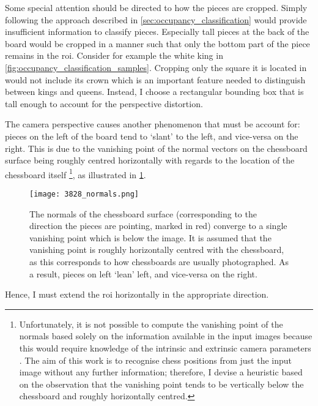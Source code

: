 \documentclass[../report.tex]{subfiles}
\begin{document}
Some special attention should be directed to how the pieces are cropped. 
Simply following the approach described in \cref{sec:occupancy_classification} would provide insufficient information to classify pieces.
Especially tall pieces at the back of the board would be cropped in a manner such that only the bottom part of the piece remains in the \gls{roi}. 
Consider for example the white king in \cref{fig:occupancy_classification_samples}.
Cropping only the square it is located in would not include its crown which is an important feature needed to distinguish between kings and queens.
Instead, I choose a rectangular bounding box that is tall enough to account for the perspective distortion.

The camera perspective causes another phenomenon that must be account for: pieces on the left of the board tend to `slant' to the left, and vice-versa on the right.
This is due to the vanishing point of the normal vectors on the chessboard surface being roughly centred horizontally with regards to the location of the chessboard itself%
\footnote{%
    Unfortunately, it is not possible to compute the vanishing point of the normals based solely on the information available in the input images because this would require knowledge of the intrinsic and extrinsic camera parameters \cite{hartley2004}.
    The aim of this work is to recognise chess positions from just the input image without any further information; therefore, I devise a heuristic based on the observation that the vanishing point tends to be vertically below the chessboard and roughly horizontally centred.
}, as illustrated in \cref{fig:occupancy_classification_normals}.
\begin{figure}
    \centering
    \texttt{[image: 3828\_normals.png]}
    \caption[The normals of the chessboard surface converge to a single vanishing point which is below the image.]{The normals of the chessboard surface (corresponding to the direction the pieces are pointing, marked in red) converge to a single vanishing point which is below the image. It is assumed that the vanishing point is roughly horizontally centred with the chessboard, as this corresponds to how chessboards are usually photographed. As a result, pieces on left `lean' left, and vice-versa on the right.}
    \label{fig:occupancy_classification_normals}
\end{figure}
Hence, I must extend the \gls{roi} horizontally in the appropriate direction.
\end{document}

